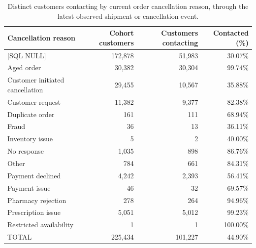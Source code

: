 \begin{table}[!htbp]
\centering
\caption{Distinct customers contacting by current order cancellation reason, through the latest observed shipment or cancellation event.}
\label{tab:customer-contacts-by-cancellation-reason}
\small
\begin{tabular}{@{}lrrr@{}}
\toprule
Cancellation reason & Cohort customers & Customers contacting & Contacted (\%) \\
\midrule

{[SQL NULL]} & 172,878 & 51,983 & 30.07\% \\
\rowcolor{yellow!35}
{Aged order} & 30,382 & 30,304 & 99.74\% \\

{Customer initiated cancellation} & 29,455 & 10,567 & 35.88\% \\

{Customer request} & 11,382 & 9,377 & 82.38\% \\

{Duplicate order} & 161 & 111 & 68.94\% \\

{Fraud} & 36 & 13 & 36.11\% \\

{Inventory issue} & 5 & 2 & 40.00\% \\

{No response} & 1,035 & 898 & 86.76\% \\

{Other} & 784 & 661 & 84.31\% \\

{Payment declined} & 4,242 & 2,393 & 56.41\% \\

{Payment issue} & 46 & 32 & 69.57\% \\

{Pharmacy rejection} & 278 & 264 & 94.96\% \\

{Prescription issue} & 5,051 & 5,012 & 99.23\% \\

{Restricted availability} & 1 & 1 & 100.00\% \\
\midrule
{TOTAL} & 225,434 & 101,227 & 44.90\% \\
\bottomrule
\end{tabular}


\end{table}
